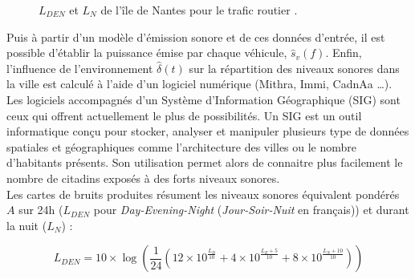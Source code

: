 \begin{figure}[t]
\centering
{}
\caption{$L_{DEN}$  et $L_N$  de l'île de Nantes pour le trafic routier \cite{nantes_carte}.}
\label{fig:carto_nantes}
\end{figure}

Puis à partir d'un modèle d'émission sonore et de ces données d'entrée, il est possible d'établir la puissance émise par chaque véhicule, $\hat{s}_{v}(f)$.
Enfin, l'influence de l'environnement $\hat{\delta}(t)$ sur la répartition des niveaux sonores dans la ville est calculé à l'aide d'un logiciel numérique (Mithra, Immi, CadnAa \dots). Les logiciels accompagnés d'un Système d'Information Géographique (SIG) sont ceux qui offrent actuellement le plus de possibilités. Un SIG est un outil informatique conçu pour stocker, analyser et manipuler plusieurs type de données spatiales et géographiques comme l'architecture des villes ou le nombre d'habitants présents. Son utilisation permet alors de connaitre plus facilement le nombre de citadins exposés à des forts niveaux sonores. \\

Les cartes de bruits produites résument les niveaux sonores équivalent pondérés $A$ sur 24h ($L_{DEN}$ pour \textit{Day-Evening-Night} (\textit{Jour-Soir-Nuit} en français)) et durant la nuit ($L_N$) :

\begin{equation}
L_{DEN} = 10\times\log \left(\frac{1}{24} \left(12\times10^{\frac{L_D}{10}}+4\times10^{\frac{L_E+5}{10}}+8\times10^{\frac{L_N+10}{10}} \right)\right)
\end{equation}

